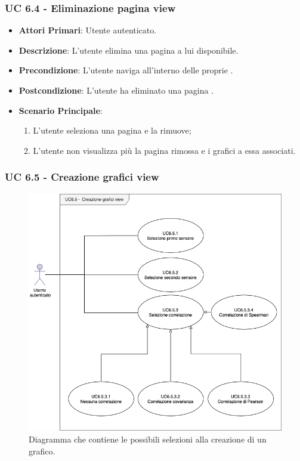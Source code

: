 			\subsubsection{UC 6.4 - Eliminazione pagina view}
			\begin{itemize}
				\item \textbf{Attori Primari}: Utente autenticato.
				\item \textbf{Descrizione}: L'utente elimina una pagina  a lui disponibile.
				\item \textbf{Precondizione}: L'utente naviga all'interno delle proprie .
				\item \textbf{Postcondizione}: L'utente ha eliminato una pagina .
				\item \textbf{Scenario Principale}:
				\begin{enumerate}
					\item L'utente seleziona una pagina  e la rimuove;
					\item L'utente non visualizza più la pagina  rimossa e i grafici a essa associati.
				\end{enumerate}	
			\end{itemize}

			\subsubsection{UC 6.5 - Creazione grafici view}

			\begin{figure}[H]
				\centering
				\includegraphics[scale=0.60]{res/images/uc6.5}
				\caption{Diagramma che contiene le possibili selezioni alla creazione di un grafico.}
			\end{figure}

